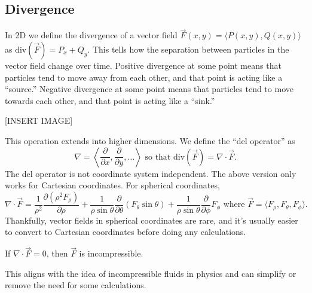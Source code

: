 \subsection{Divergence}
\noindent
In 2D we define the divergence of a vector field $\vec{F}(x,y) = \langle P(x,y), Q(x,y) \rangle$ as $\text{div}(\vec{F}) = P_x+Q_y$. This tells how the separation between particles in the vector field change over time. Positive divergence at some point means that particles tend to move away from each other, and that point is acting like a “source.” Negative divergence at some point means that particles tend to move towards each other, and that point is acting like a “sink.”

[INSERT IMAGE]

\noindent
This operation extends into higher dimensions. We define the ``del operator'' as
\begin{equation*}
	\nabla = \left< \frac{\partial}{\partial x}, \frac{\partial}{\partial y},\ldots\right> \text{ so that } \text{div}(\vec{F}) = \nabla \cdot \vec{F}.
\end{equation*}
The del operator is not coordinate system independent. The above version only works for Cartesian coordinates. For spherical coordinates,
\begin{equation*}
	\nabla \cdot \vec{F} = \frac{1}{\rho^2}\frac{\partial(\rho^2 F_\rho)}{\partial\rho} + \frac{1}{\rho\sin{\theta}}\frac{\partial}{\partial\theta}(F_\theta \sin{\theta}) + \frac{1}{\rho\sin{\theta}}\frac{\partial}{\partial\phi}F_\phi  \text{ where } \vec{F} = \langle F_\rho, F_\theta, F_\phi \rangle.
\end{equation*}
Thankfully, vector fields in spherical coordinates are rare, and it's usually easier to convert to Cartesian coordinates before doing any calculations.\\

\begin{definition}
	If $\nabla \cdot \vec{F} = 0$, then $\vec{F}$ is incompressible.
\end{definition}
\noindent
This aligns with the idea of incompressible fluids in physics and can simplify or remove the need for some calculations.

